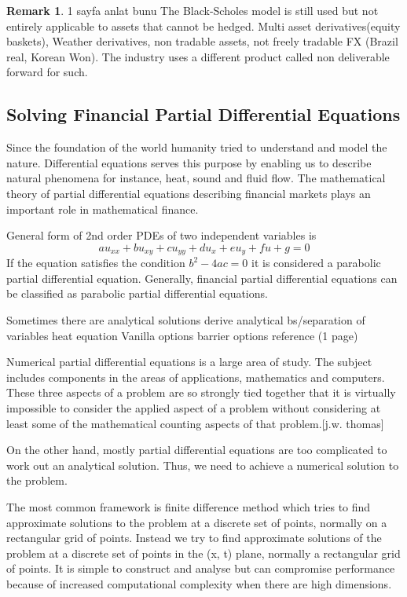 \documentclass[12pt, oneside]{book}
\theoremstyle{plain}
\theoremstyle{definition}
\newtheorem{remark}[theorem]{Remark}
\begin{document}
\begin{remark} 1 sayfa anlat bunu
The Black-Scholes model is still  used but not entirely applicable to assets that cannot be hedged. Multi asset derivatives(equity baskets), Weather derivatives, non tradable assets, not freely tradable FX (Brazil real, Korean Won). The industry uses a different product called non deliverable forward for such.
\end{remark}



\subsection{Solving Financial Partial Differential Equations}


Since the foundation of the world humanity tried to understand and model the nature. Differential equations serves this purpose by enabling us to describe natural phenomena for instance, heat, sound and fluid flow. The mathematical theory of partial differential equations describing financial markets plays an important role in mathematical finance.

General form of 2nd order PDEs of two independent variables is $$ au_{xx} + bu_{xy} + cu_{yy} + du_x + eu_y + fu + g = 0 $$ If the equation satisfies the condition $ b^2 - 4ac = 0 $  it is considered a parabolic partial differential equation. Generally, financial partial differential equations can be classified as parabolic partial differential equations.


Sometimes there are analytical solutions derive analytical bs/separation of variables heat equation Vanilla options barrier options reference (1 page)

Numerical partial differential equations is a large area of study. The subject includes components in the areas of applications, mathematics and computers. These three aspects of a problem are so strongly tied together that it is virtually impossible to consider the applied aspect of a problem without considering at least some of the mathematical counting aspects of that problem.[j.w. thomas]

On the other hand, mostly partial differential equations are too complicated to work out an analytical solution. Thus, we need to achieve a numerical solution to the problem.

The most common framework is finite difference method which tries to find approximate solutions to the problem at a discrete set of points, normally on a rectangular grid of points.
Instead we try to find approximate solutions of the problem at a discrete set of points in the (x, t) plane, normally a rectangular grid of points. It is simple to construct and analyse but can compromise performance because of increased computational complexity when there are high dimensions. 
\end{document}

